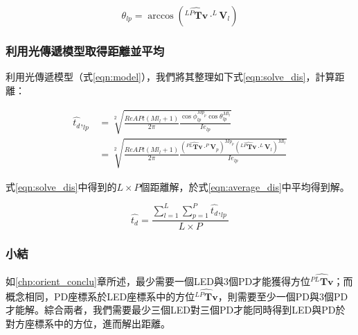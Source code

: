         \begin{equation}
            \label{eqn:solve_outang}
            \theta_{lp} = \arccos(\hat{{^{LP}\boldsymbol{Tv}}}\cdot ^L\boldsymbol{V}_l)
        \end{equation}

        \subsubsection{利用光傳遞模型取得距離並平均}
        \label{chp:dis_average}

        利用光傳遞模型（式\ref{eqn:model}），我們將其整理如下式\ref{eqn:solve_dis}，計算距離：

        \begin{equation}
            \label{eqn:solve_dis}
            \begin{aligned}
            \hat{t_d },_{lp} &= \sqrt[2]{\frac{ReAPt (Ml_{l}+1)}{2\pi}
                \frac{\cos\phi_{lp}^{Mp_{p}}\cos \theta_{lp}^{Ml_{l}} }
                {Ie_{lp}}
            }\\
            & = \sqrt[2]
            {
                \frac{ReAPt (Ml_{l}+1)}{2\pi}
                \frac{
                    (\hat{{^{PL}\boldsymbol{Tv}}}\cdot ^P\boldsymbol{V}_p)^{Mp_{p}}
                    (\hat{{^{LP}\boldsymbol{Tv}}}\cdot ^L\boldsymbol{V}_l)^{Ml_{l}} }
                {Ie_{lp}}
            }
            \end{aligned}
        \end{equation}


        式\ref{eqn:solve_dis}中得到的$L\times P$個距離解，於式\ref{eqn:average_dis}中平均得到解。

        \begin{equation}
            \label{eqn:average_dis}
            \hat{t_d }= \frac{\sum^{L}_{l=1}\sum^{P}_{p=1} \hat{t_d },_{lp} }{L\times P}
        \end{equation}

        \subsubsection{小結}

        如\ref{chp:orient_conclu}章所述，最少需要一個LED與3個PD才能獲得方位$\hat{{^{PL}\boldsymbol{Tv}}}$；而概念相同，PD座標系於LED座標系中的方位$\hat{{^{LP}\boldsymbol{Tv}}}$，則需要至少一個PD與3個PD才能解。綜合兩者，我們需要最少三個LED對三個PD才能同時得到LED與PD於對方座標系中的方位，進而解出距離。


